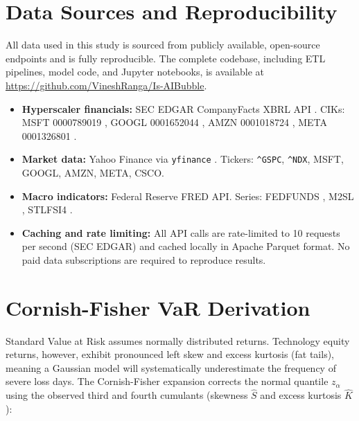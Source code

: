 \documentclass[11pt]{article}
\begin{document}

\clearpage

\clearpage

\clearpage

\clearpage


\clearpage

\section{Data Sources and Reproducibility}
\label{sec:data}

All data used in this study is sourced from publicly available, open-source endpoints
and is fully reproducible. The complete codebase, including ETL pipelines, model code,
and Jupyter notebooks, is available at \url{https://github.com/VineshRanga/Is-AIBubble}.

\begin{itemize}
  \item \textbf{Hyperscaler financials:} SEC EDGAR CompanyFacts XBRL API
    \citep{sec_xbrl_api}. CIKs: MSFT 0000789019 \citep{msft_10k_2025},
    GOOGL 0001652044 \citep{googl_10k_2025}, AMZN 0001018724 \citep{amzn_10k_2025},
    META 0001326801 \citep{meta_10k_2025}.
  \item \textbf{Market data:} Yahoo Finance via \texttt{yfinance} \citep{yfinance}.
    Tickers: \texttt{\^{}GSPC}, \texttt{\^{}NDX}, MSFT, GOOGL, AMZN, META, CSCO.
  \item \textbf{Macro indicators:} Federal Reserve FRED API. Series: FEDFUNDS
    \citep{fred_fedfunds}, M2SL \citep{fred_m2}, STLFSI4 \citep{fred_stlfsi}.
  \item \textbf{Caching and rate limiting:} All API calls are rate-limited to 10
    requests per second (SEC EDGAR) and cached locally in Apache Parquet format.
    No paid data subscriptions are required to reproduce results.
\end{itemize}

\clearpage
\printbibliography[heading=bibintoc, title={References}]

\clearpage
\appendix

\section{Cornish-Fisher VaR Derivation}
\label{app:cf}

Standard Value at Risk assumes normally distributed returns. Technology equity returns,
however, exhibit pronounced left skew and excess kurtosis (fat tails), meaning a Gaussian
model will systematically underestimate the frequency of severe loss days. The Cornish-Fisher
expansion corrects the normal quantile $z_\alpha$ using the observed third and fourth
cumulants (skewness $\hat{S}$ and excess kurtosis $\hat{K}$):
\end{document}
